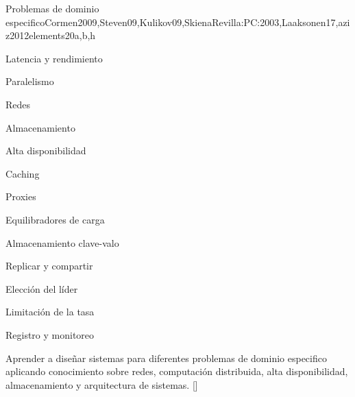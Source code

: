 \begin{syllabus}
  \begin{unit}{Problemas de dominio especifico}{}{Cormen2009,Steven09,Kulikov09,SkienaRevilla:PC:2003,Laaksonen17,aziz2012elements}{20}{a,b,h}
    \begin{topics}
      \item Latencia y rendimiento
      \item Paralelismo
      \item Redes
      \item Almacenamiento
      \item Alta disponibilidad
      \item Caching
      \item Proxies
      \item Equilibradores de carga
      \item Almacenamiento clave-valo
      \item Replicar y compartir
      \item Elección del líder
      \item Limitación de la tasa
      \item Registro y monitoreo
    \end{topics}
    \begin{learningoutcomes}
        \item Aprender a diseñar sistemas para diferentes problemas de dominio especifico aplicando conocimiento sobre redes, computación distribuida, alta disponibilidad, almacenamiento y arquitectura de sistemas. [\Usage]
    \end{learningoutcomes}
  \end{unit}
  
  \begin{coursebibliography}
  \end{coursebibliography}
  
  \end{syllabus}
  